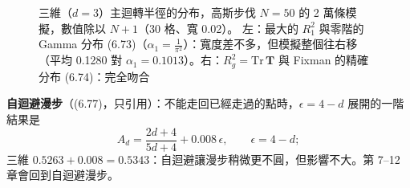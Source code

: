 \begin{figure}[htbp]
\centering
\SixFigFixman
\caption{三維（$d=3$）主迴轉半徑的分布，高斯步伐 $N=50$ 的 2 萬條模擬，數值除以 $N+1$（30 格、寬 0.02）。
左：最大的 $R_1^2$ 與零階的 Gamma 分布 (6.73)（$\alpha_1=\frac1{\pi^2}$）：寬度差不多，但模擬整個往右移（平均 0.1280 對 $\alpha_1=0.1013$）。右：$R_g^2=\mathrm{Tr}\,\mathbf T$ 與 Fixman 的精確分布 (6.74)：完全吻合}\label{six-fig-fix}
\end{figure}

\textbf{自迴避漫步}（(6.77)，只引用）：不能走回已經走過的點時，$\epsilon=4-d$ 展開的一階結果是
\[A_d=\frac{2d+4}{5d+4}+0.008\,\epsilon,\qquad \epsilon=4-d;\tag{6.77}\]
三維 $0.5263+0.008=0.5343$：自迴避讓漫步稍微更不圓，但影響不大。第 7--12 章會回到自迴避漫步。

